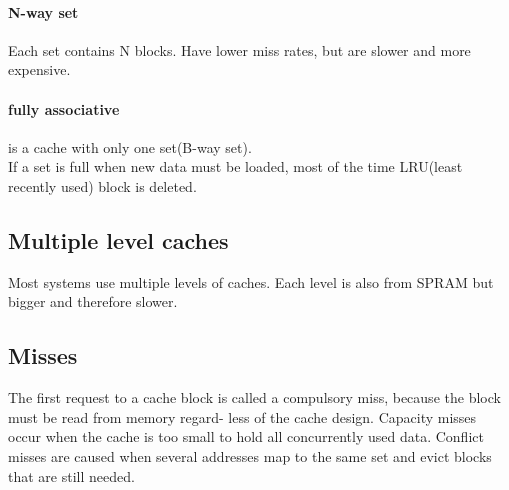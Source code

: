 	\paragraph{N-way set}
		Each set contains N blocks. Have lower miss rates, but are slower and more expensive.
	\paragraph{fully associative} is a cache with only one set(B-way set).\\
	If a set is full when new data must be loaded, most of the time LRU(least recently used) block is deleted.
	\subsection{Multiple level caches}
	Most systems use multiple levels of caches. Each level is also from SPRAM but bigger and therefore slower.
	\subsection{Misses}
	The first request to a cache block is called a compulsory miss, because the block must be read from memory regard- less of the cache design. Capacity misses occur when the cache is too small to hold all concurrently used data. Conflict misses are caused when several addresses map to the same set and evict blocks that are still needed.
	
